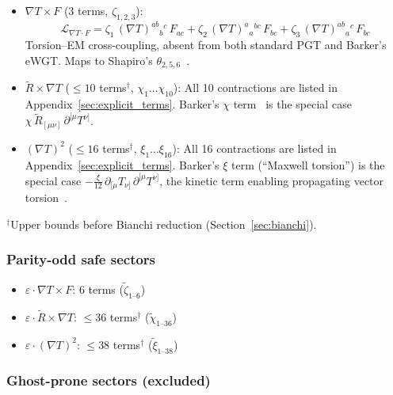 \documentclass[12pt,a4paper]{article}
\newcommand{\Rt}{\tilde{R}}         %
\newcommand{\del}{\nabla}            %
\newcommand{\pd}{\partial}           %
\newcommand{\eps}{\varepsilon}       %
\begin{document}
\begin{itemize}
  \item \textbf{$\del T \times F$} (3 terms, $\zeta_{1,2,3}$):
    \begin{equation}
      \mathcal{L}_{\del T \cdot F}
      = \zeta_1\, (\del T)^{ab}{}_{b}{}^{c}\, F_{ac}
      + \zeta_2\, (\del T)^{a}{}_{a}{}^{bc}\, F_{bc}
      + \zeta_3\, (\del T)^{ab}{}_{a}{}^{c}\, F_{bc}
      \label{eq:dt_f}
    \end{equation}
    Torsion--EM cross-coupling, absent from both standard PGT and
    Barker's eWGT. Maps to Shapiro's $\theta_{2,5,6}$~\cite{Shapiro:2001rz}.
  \item \textbf{$\Rt \times \del T$} ($\leq 10$ terms$^\dagger$,
    $\chi_1 \ldots \chi_{10}$):
    All 10 contractions are listed in Appendix~\ref{sec:explicit_terms}.
    Barker's $\chi$ term~\cite{Barker:2024ydb} is the special case
    $\chi\, \Rt_{[\mu\nu]}\, \pd^{[\mu} T^{\nu]}$.
  \item \textbf{$(\del T)^2$} ($\leq 16$ terms$^\dagger$,
    $\xi_1 \ldots \xi_{16}$):
    All 16 contractions are listed in Appendix~\ref{sec:explicit_terms}.
    Barker's $\xi$ term (``Maxwell torsion'') is the special case
    $-\frac{\xi}{12}\, \pd_{[\mu} T_{\nu]}\, \pd^{[\mu} T^{\nu]}$,
    the kinetic term enabling propagating vector
    torsion~\cite{Barker:2024ydb}.
\end{itemize}
\noindent${}^\dagger$Upper bounds before Bianchi reduction
(Section~\ref{sec:bianchi}).

\subsubsection{Parity-odd safe sectors}

\begin{itemize}
  \item $\eps \cdot \del T \times F$: 6 terms ($\tilde{\zeta}_{1\text{--}6}$)
  \item $\eps \cdot \Rt \times \del T$: $\leq 36$ terms$^\dagger$
    ($\tilde{\chi}_{1\text{--}36}$)
  \item $\eps \cdot (\del T)^2$: $\leq 38$ terms$^\dagger$
    ($\tilde{\xi}_{1\text{--}38}$)
\end{itemize}

\subsubsection{Ghost-prone sectors (excluded)}
\end{document}
